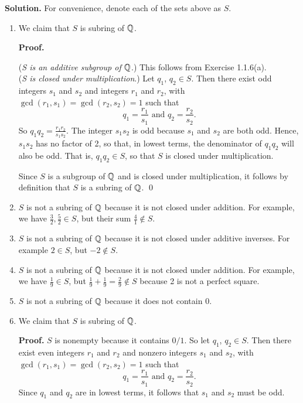 \begin{enumerate}
      \textbf{Solution.} For convenience, denote each of the sets above as $S$.

      \begin{enumerate}
         \item We claim that $S$ is subring of $\mathbb{Q}$.

               \textbf{Proof.}

               (\textit{S is an additive subgroup of $\mathbb{Q}$}.) This follows from 
               Exercise 1.1.6(a). \\

               (\textit{S is closed under multiplication}.) Let $q_1$,
               $q_2 \in S$. Then there exist odd integers $s_1$ and $s_2$ and 
               integers $r_1$ and $r_2$, with
               $\gcd(r_1, s_1) = \gcd(r_2, s_2) = 1$ such that
               $$q_1 = \frac{r_1}{s_1} \text{ and } q_2 = \frac{r_2}{s_2}.$$
               So $q_1q_2 = \frac{r_1r_2}{s_1s_2}$. The integer $s_1s_2$ is odd
               because $s_1$ and $s_2$ are both odd. Hence, $s_1s_2$ has no
               factor of 2, so that, in lowest terms, the denominator of
               $q_1q_2$ will also be odd. That is, $q_1q_2 \in S$, so that $S$
               is closed under multiplication.
            
               Since $S$ is a subgroup of $\mathbb{Q}$ and is closed under
               multiplication, it follows by definition that $S$ is a subring of 
               $\mathbb{Q}$. \qed
         \item $S$ is not a subring of $\mathbb{Q}$ because it is not closed under
               addition. For example, we have $\frac{3}{2}, \frac{5}{2} \in S$,
               but their sum $\frac{4}{1} \notin S$.
         \item $S$ is not a subring of $\mathbb{Q}$ because it is not closed under
               additive inverses. For example $2 \in S$, but $-2 \notin S$.
         \item $S$ is not a subring of $\mathbb{Q}$ because it is not closed under
               addition. For example, we have $\frac{1}{9} \in S$, but
               $\frac{1}{9} + \frac{1}{9} = \frac{2}{9} \notin S$ because 2 is
               not a perfect square.
         \item $S$ is not a subring of $\mathbb{Q}$ because it does not contain 0.
         \item We claim that $S$ is subring of $\mathbb{Q}$.

               \textbf{Proof.} $S$ is nonempty because it contains $0/1$. So let
               $q_1$, $q_2 \in S$. Then there exist even integers $r_1$ and
               $r_2$ and nonzero integers $s_1$ and $s_2$, with
               $\gcd(r_1, s_1) = \gcd(r_2, s_2) = 1$ such that
               $$q_1 = \frac{r_1}{s_1} \text{ and } q_2 = \frac{r_2}{s_2}.$$
               Since $q_1$ and $q_2$ are in lowest terms, it follows that $s_1$
               and $s_2$ must be odd. 


\end{enumerate}
\end{enumerate}
